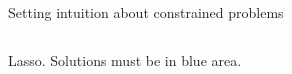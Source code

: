 \documentclass[mathserif, handout, aspectratio=169]{beamer}
\begin{document}
\begin{frame}{Setting intuition about constrained problems}
\begin{columns}
\begin{center}
Lasso.   Solutions must be in blue area.
\end{center}


\end{columns}
\end{frame}
\end{document}
